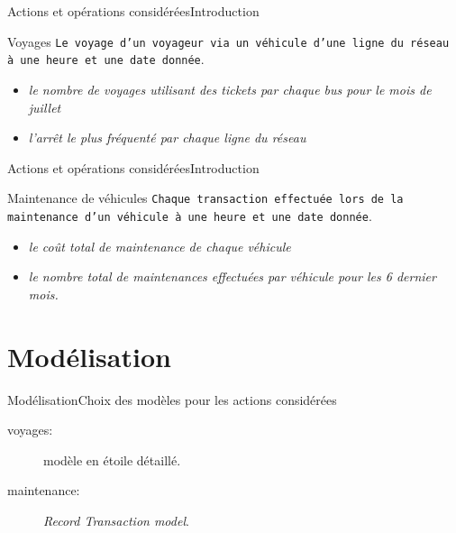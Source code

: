 \documentclass[a4paper,12pt,usenames,dvipsnames]{beamer}
\begin{document}
\begin{frame}{Actions et opérations considérées}{Introduction}
  \begin{block}{Voyages}
    \texttt{Le voyage d'un voyageur via un véhicule d'une ligne du réseau à une heure et une date donnée}.
  \end{block}

  \begin{examples}
    \begin{itemize}
      \item<1-> \textit{le nombre de voyages utilisant des tickets par chaque bus pour le mois de juillet}
      \item<2-> \textit{l'arrêt le plus fréquenté par chaque ligne du réseau}
    \end{itemize}
  \end{examples}
\end{frame}

\begin{frame}{Actions et opérations considérées}{Introduction}
  \begin{block}{Maintenance de véhicules}
    \texttt{Chaque transaction effectuée lors de la maintenance d'un véhicule à une heure et une date donnée}.
  \end{block}

  \begin{examples}
    \begin{itemize}
      \item<1-> \textit{le coût total de maintenance de chaque véhicule}
      \item<2-> \textit{le nombre total de maintenances effectuées par véhicule pour les 6 dernier mois.}
    \end{itemize}
  \end{examples}
\end{frame}

\section{Modélisation}
\begin{frame}{Modélisation}{Choix des modèles pour les actions considérées}
  \begin{description}
    \item[voyages:] modèle en étoile détaillé.
    \item[maintenance:] \textit{Record Transaction model}.
  \end{description}
\end{frame}
\end{document}

